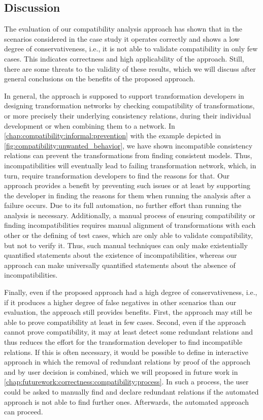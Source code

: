 \subsection{Discussion}

The evaluation of our compatibility analysis approach has shown that in the scenarios considered in the case study it operates correctly and shows a low degree of conservativeness, i.e., it is not able to validate compatibility in only few cases.
This indicates correctness and high applicability of the approach.
Still, there are some threats to the validity of these results, which we will discuss after general conclusions on the benefits of the proposed approach.

In general, the approach is supposed to support transformation developers in designing transformation networks by checking compatibility of transformations, or more precisely their underlying consistency relations, during their individual development or when combining them to a network.
In \autoref{chap:compatibility:informal:prevention} with the example depicted in \autoref{fig:compatibility:unwanted_behavior}, we have shown incompatible consistency relations can prevent the transformations from finding consistent models.
Thus, incompatibilities will eventually lead to failing transformation network, which, in turn, require transformation developers to find the reasons for that.
Our approach provides a benefit by preventing such issues or at least by supporting the developer in finding the reasons for them when running the analysis after a failure occurs.
Due to its full automation, no further effort than running the analysis is necessary.
Additionally, a manual process of ensuring compatibility or finding incompatibilities requires manual alignment of transformations with each other or the defining of test cases, which are only able to validate compatibility, but not to verify it.
Thus, such manual techniques can only make existentially quantified statements about the existence of incompatibilities, whereas our approach can make universally quantified statements about the absence of incompatibilities.

Finally, even if the proposed approach had a high degree of conservativeness, i.e., if it produces a higher degree of false negatives in other scenarios than our evaluation, the approach still provides benefits.
First, the approach may still be able to prove compatibility at least in few cases.
Second, even if the approach cannot prove compatibility, it may at least detect some redundant relations and thus reduces the effort for the transformation developer to find incompatible relations.
If this is often necessary, it would be possible to define in interactive approach in which the removal of redundant relations by proof of the approach and by user decision is combined, which we will proposed in future work in \autoref{chap:futurework:correctness:compatibility:process}.
In such a process, the user could be asked to manually find and declare redundant relations if the automated approach is not able to find further ones.
Afterwards, the automated approach can proceed.


